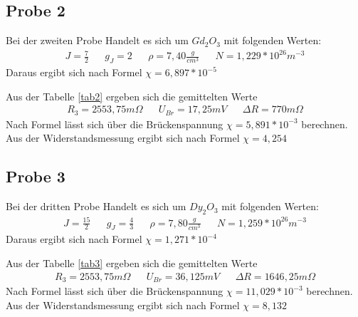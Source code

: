\subsection{Probe 2}
Bei der zweiten Probe Handelt es sich um $Gd_2O_3$ mit folgenden Werten:
\begin{align*}
&J=\frac72&
&g_J=2&
&\rho=7,40\frac{g}{cm^3}&
&N=1,229*10^{26}m^{-3}&
\end{align*}
Daraus ergibt sich nach Formel 
$\chi=6,897*10^{-5}$

Aus der Tabelle \ref{tab2} ergeben sich die gemittelten Werte
\begin{align*}
&R_3=2553,75m\Omega&
&U_{Br}=17,25mV&
&\Delta R=770m\Omega&
\end{align*}
Nach Formel lässt sich über die Brückenspannung
$\chi=5,891*10^{-3}$
berechnen.
\\
Aus der Widerstandsmessung ergibt sich nach Formel
$\chi=4,254$


\subsection{Probe 3}
Bei der dritten Probe Handelt es sich um $Dy_2O_3$ mit folgenden Werten:
\begin{align*}
&J=\frac{15}{2}&
&g_J=\frac43&
&\rho=7,80\frac{g}{cm^3}&
&N=1,259*10^{26}m^{-3}&
\end{align*}
Daraus ergibt sich nach Formel 
$\chi=1,271*10^{-4}$

Aus der Tabelle \ref{tab3} ergeben sich die gemittelten Werte
\begin{align*}
&R_3=2553,75m\Omega&
&U_{Br}=36,125mV&
&\Delta R=1646,25m\Omega&
\end{align*}
Nach Formel lässt sich über die Brückenspannung
$\chi=11,029*10^{-3}$
berechnen.
\\
Aus der Widerstandsmessung ergibt sich nach Formel
$\chi=8,132$